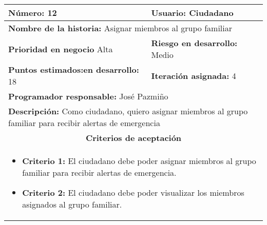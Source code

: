 \begin{longtable}{|p{6.7cm}|p{6.7cm}|}
    \textbf{Número:} 12                                  & \textbf{Usuario:} Ciudadano                                                               \\
    \hline
    \multicolumn{2}{|l|}{\textbf{Nombre de la historia:} Asignar miembros al grupo familiar}                                                         \\
    \hline
    \textbf{Prioridad en negocio}  Alta                  & \textbf{Riesgo en desarrollo:} Medio                                                      \\
    \hline
    \textbf{\textbf{Puntos estimados:}en desarrollo:} 18 & \textbf{Iteración asignada:} 4                                                            \\
    \hline
    \multicolumn{2}{|l|}{\textbf{Programador responsable:} José Pazmiño }                                                                            \\
    \hline
    \multicolumn{2}{|p{13.4cm}|}{\textbf{Descripción:} Como ciudadano, quiero asignar miembros al grupo familiar para recibir alertas de emergencia} \\
    \hline
    \multicolumn{2}{|c|}{\textbf{Criterios de aceptación}}                                                                                           \\
    \hline
    \multicolumn{2}{|p{13.4cm}|}{
    \begin{itemize}[label={},leftmargin=*, nosep]
        \item \textbf{Criterio 1:} El ciudadano debe poder asignar miembros al grupo familiar para recibir alertas de emergencia.
        \item \textbf{Criterio 2:} El ciudadano debe poder visualizar los miembros asignados al grupo familiar.
    \end{itemize}
    }                                                                                                                                                \\
\end{longtable}



